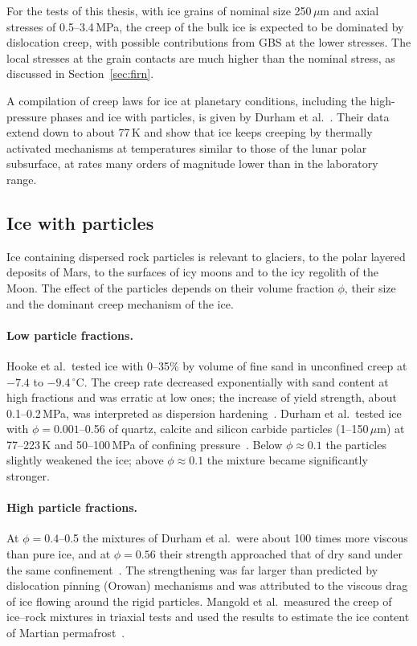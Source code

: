 For the tests of this thesis, with ice grains of nominal size 250\,$\mu$m and axial stresses of 0.5--3.4\,MPa, the creep of the bulk ice is expected to be dominated by dislocation creep, with possible contributions from GBS at the lower stresses. The local stresses at the grain contacts are much higher than the nominal stress, as discussed in Section~\ref{sec:firn}.

A compilation of creep laws for ice at planetary conditions, including the high-pressure phases and ice with particles, is given by Durham et al.~\cite{durham1997}. Their data extend down to about 77\,K and show that ice keeps creeping by thermally activated mechanisms at temperatures similar to those of the lunar polar subsurface, at rates many orders of magnitude lower than in the laboratory range.

\subsection{Ice with particles}
\label{subsec:ice_particles}

Ice containing dispersed rock particles is relevant to glaciers, to the polar layered deposits of Mars, to the surfaces of icy moons and to the icy regolith of the Moon. The effect of the particles depends on their volume fraction $\phi$, their size and the dominant creep mechanism of the ice.

\paragraph{Low particle fractions.} Hooke et al.\ tested ice with 0--35\% by volume of fine sand in unconfined creep at $-7.4$ to $-9.4\,^\circ$C. The creep rate decreased exponentially with sand content at high fractions and was erratic at low ones; the increase of yield strength, about 0.1--0.2\,MPa, was interpreted as dispersion hardening~\cite{hooke1972}. Durham et al.\ tested ice with $\phi = 0.001$--0.56 of quartz, calcite and silicon carbide particles (1--150\,$\mu$m) at 77--223\,K and 50--100\,MPa of confining pressure~\cite{durham1992}. Below $\phi\approx0.1$ the particles slightly weakened the ice; above $\phi\approx0.1$ the mixture became significantly stronger.

\paragraph{High particle fractions.} At $\phi = 0.4$--0.5 the mixtures of Durham et al.\ were about 100 times more viscous than pure ice, and at $\phi = 0.56$ their strength approached that of dry sand under the same confinement~\cite{durham1992}. The strengthening was far larger than predicted by dislocation pinning (Orowan) mechanisms and was attributed to the viscous drag of ice flowing around the rigid particles. Mangold et al.\ measured the creep of ice--rock mixtures in triaxial tests and used the results to estimate the ice content of Martian permafrost~\cite{mangold2002}.

